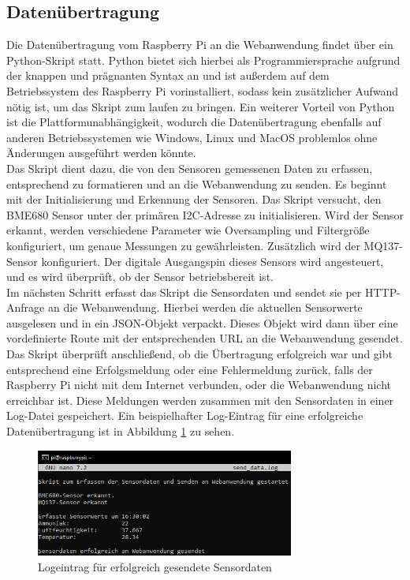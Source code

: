\documentclass[conference]{IEEEtran}
\begin{document}
\subsection{Datenübertragung}
\label{chapter:datenuebertragung}
Die Datenübertragung vom Raspberry Pi an die Webanwendung findet über ein Python-Skript statt. Python bietet sich hierbei als Programmiersprache aufgrund der knappen und prägnanten Syntax an und ist außerdem auf dem Betriebssystem des Raspberry Pi vorinstalliert, sodass kein zusätzlicher Aufwand nötig ist, um das Skript zum laufen zu bringen. Ein weiterer Vorteil von Python ist die Plattformunabhängigkeit, wodurch die Datenübertragung ebenfalls auf anderen Betriebssystemen wie Windows, Linux und MacOS problemlos ohne Änderungen ausgeführt werden könnte. \\
Das Skript dient dazu, die von den Sensoren gemessenen Daten zu erfassen, entsprechend zu formatieren und an die Webanwendung zu senden. Es beginnt mit der Initialisierung und Erkennung der Sensoren. Das Skript versucht, den BME680 Sensor unter der primären I2C-Adresse zu initialisieren. Wird der Sensor erkannt, werden verschiedene Parameter wie Oversampling und Filtergröße konfiguriert, um genaue Messungen zu gewährleisten. Zusätzlich wird der MQ137-Sensor konfiguriert. Der digitale Ausgangspin dieses Sensors wird angesteuert, und es wird überprüft, ob der Sensor betriebsbereit ist. \\
Im nächsten Schritt erfasst das Skript die Sensordaten und sendet sie per HTTP-Anfrage an die Webanwendung. Hierbei werden die aktuellen Sensorwerte ausgelesen und in ein JSON-Objekt verpackt. Dieses Objekt wird dann über eine vordefinierte Route mit der entsprechenden URL an die Webanwendung gesendet. Das Skript überprüft anschließend, ob die Übertragung erfolgreich war und gibt entsprechend eine Erfolgsmeldung oder eine Fehlermeldung zurück, falls der Raspberry Pi nicht mit dem Internet verbunden, oder die Webanwendung nicht erreichbar ist. Diese Meldungen werden zusammen mit den Sensordaten in einer Log-Datei gespeichert. Ein beispielhafter Log-Eintrag für eine erfolgreiche Datenübertragung ist in Abbildung \ref{send_data_success} zu sehen. 
\begin{figure}[H]
	\centering
	\includegraphics[width=85mm]{fig/daten_erfolgreich_gesendet.png}
	\caption{Logeintrag für erfolgreich gesendete Sensordaten}
	\label{send_data_success}
\end{figure}
\end{document}
